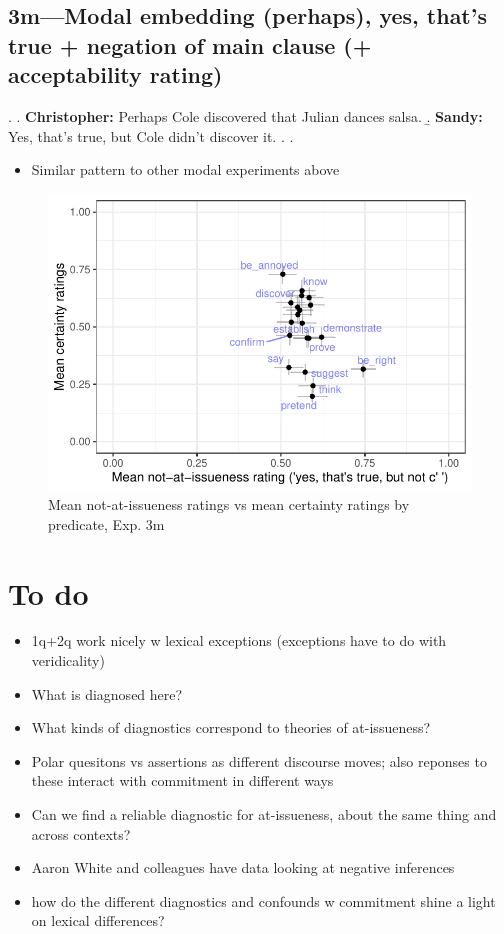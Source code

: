 \documentclass[11pt]{article}
\begin{document}

	\pagebreak
	\subsection{3m---Modal embedding (perhaps), yes, that's true + negation of main clause (+ acceptability rating)} %
		\ex. \a. \textbf{Christopher:} Perhaps Cole discovered that Julian dances salsa.
			\b. \textbf{Sandy:} Yes, that’s true, but Cole didn't discover it.
			\z.
		\z.

		\begin{itemize}
			\item Similar pattern to other modal experiments above
		\end{itemize}

		\begin{figure}[h]
			\centering
			\includegraphics[]{figures/m3-correl.pdf}
			\caption{Mean not-at-issueness ratings vs mean certainty ratings by predicate, Exp. 3m}
			\label{fig:m3-corr}
		\end{figure}
	
	
\pagebreak
\section{To do} %
	
	\begin{itemize}
		\item 1q+2q work nicely w lexical exceptions (exceptions have to do with veridicality)
		\item What is diagnosed here?
		\item What kinds of diagnostics correspond to theories of at-issueness?
		\item Polar quesitons vs assertions as different discourse moves; also reponses to these interact with commitment in different ways
		\item Can we find a reliable diagnostic for at-issueness, about the same thing and across contexts?
		\item Aaron White and colleagues have data looking at negative inferences
		\item how do the different diagnostics and confounds w commitment shine a light on lexical differences?
	\end{itemize}


\end{document}
